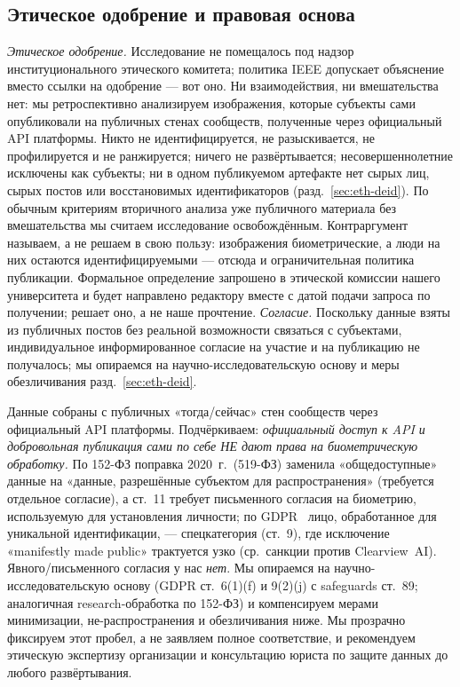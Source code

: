 \documentclass[journal]{IEEEtran}
\begin{document}
\subsection{Этическое одобрение и правовая основа}\label{sec:eth-legal}
\emph{Этическое одобрение.} Исследование не помещалось под надзор институционального этического комитета; политика IEEE допускает объяснение вместо ссылки на одобрение — вот оно. Ни взаимодействия, ни вмешательства нет: мы ретроспективно анализируем изображения, которые субъекты сами опубликовали на публичных стенах сообществ, полученные через официальный API платформы. Никто не идентифицируется, не разыскивается, не профилируется и не ранжируется; ничего не развёртывается; несовершеннолетние исключены как субъекты; ни в одном публикуемом артефакте нет сырых лиц, сырых постов или восстановимых идентификаторов (разд.~\ref{sec:eth-deid}). По обычным критериям вторичного анализа уже публичного материала без вмешательства мы считаем исследование освобождённым. Контраргумент называем, а не решаем в свою пользу: изображения биометрические, а люди на них остаются идентифицируемыми — отсюда и ограничительная политика публикации. Формальное определение запрошено в этической комиссии нашего университета и будет направлено редактору вместе с датой подачи запроса по получении; решает оно, а не наше прочтение. \emph{Согласие.} Поскольку данные взяты из публичных постов без реальной возможности связаться с субъектами, индивидуальное информированное согласие на участие и на публикацию не получалось; мы опираемся на научно-исследовательскую основу и меры обезличивания разд.~\ref{sec:eth-deid}.

Данные собраны с публичных «тогда/сейчас» стен сообществ через официальный API платформы. Подчёркиваем: \emph{официальный доступ к API и добровольная публикация сами по себе НЕ дают права на биометрическую обработку.} По 152-ФЗ поправка 2020~г.\ (519-ФЗ) заменила «общедоступные» данные на «данные, разрешённые субъектом для распространения» (требуется отдельное согласие), а ст.~11 требует письменного согласия на биометрию, используемую для установления личности; по GDPR~\cite{gdpr2016} лицо, обработанное для уникальной идентификации, --- спецкатегория (ст.~9), где исключение «manifestly made public» трактуется узко (ср.\ санкции против Clearview~AI). Явного/письменного согласия у нас \emph{нет}. Мы опираемся на научно-исследовательскую основу (GDPR ст.~6(1)(f) и 9(2)(j) с safeguards ст.~89; аналогичная research-обработка по 152-ФЗ) и компенсируем мерами минимизации, не-распространения и обезличивания ниже. Мы прозрачно фиксируем этот пробел, а не заявляем полное соответствие, и рекомендуем этическую экспертизу организации и консультацию юриста по защите данных до любого развёртывания.
\end{document}
